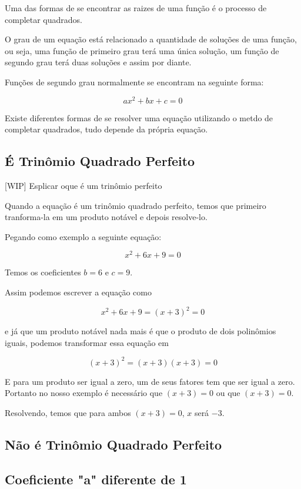 \documentclass[../resumo.tex]{subfiles}
\begin{document}
	Uma das formas de se encontrar as raizes de uma função é o processo de completar quadrados.

	O grau de um equação está relacionado a quantidade de soluções de uma função, ou seja, uma função
	de primeiro grau terá uma única solução, um função de segundo grau terá duas soluções e assim por diante.

	Funções de segundo grau normalmente se encontram na seguinte forma:

	\[ ax^2 + bx + c = 0 \]

	Existe diferentes formas de se resolver uma equação utilizando o metdo de completar quadrados, tudo depende 
	da própria equação.

	\subsection{É Trinômio Quadrado Perfeito}

	[WIP] Esplicar oque é um trinômio perfeito


	Quando a equação é um trinômio quadrado perfeito, temos que primeiro tranforma-la em um produto notável
	e depois resolve-lo.

	Pegando como exemplo a seguinte equação:

	\[ x^2 + 6x + 9 = 0 \]

	Temos os coeficientes $b = 6$ e $c = 9$.

	Assim podemos escrever a equação como

	\[ x^2 + 6x + 9 = (x + 3)^2 = 0 \]

	e já que um produto notável nada mais é que o produto de dois polinômios iguais, podemos transformar 
	essa equação em

	\[ (x + 3)^2 = (x + 3)(x + 3) = 0 \]

	E para um produto ser igual a zero, um de seus fatores tem que ser igual a zero. Portanto no nosso exemplo
	é necessário que $(x + 3) = 0$ ou que $(x + 3) = 0$.

	Resolvendo, temos que para ambos $(x + 3) = 0$, $x$ será $-3$. 

	\subsection{Não é Trinômio Quadrado Perfeito}

	\subsection{Coeficiente "a" diferente de 1}
\end{document}
